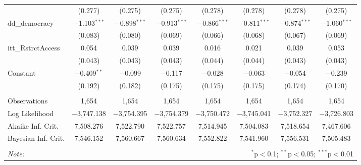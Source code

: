 \begin{sidewaystable}[!htbp]
\begin{tabular}{@{\extracolsep{5pt}}lccccccc}
  & (0.277) & (0.275) & (0.275) & (0.278) & (0.278) & (0.278) & (0.275) \\ 
  dd\_democracy & $-$1.103$^{***}$ & $-$0.898$^{***}$ & $-$0.913$^{***}$ & $-$0.866$^{***}$ & $-$0.811$^{***}$ & $-$0.874$^{***}$ & $-$1.060$^{***}$ \\ 
  & (0.083) & (0.080) & (0.069) & (0.066) & (0.068) & (0.067) & (0.069) \\ 
  itt\_RstrctAccess & 0.054 & 0.039 & 0.039 & 0.016 & 0.021 & 0.039 & 0.053 \\ 
  & (0.043) & (0.043) & (0.043) & (0.044) & (0.044) & (0.043) & (0.043) \\ 
  Constant & $-$0.409$^{**}$ & $-$0.099 & $-$0.117 & $-$0.028 & $-$0.063 & $-$0.054 & $-$0.239 \\ 
  & (0.192) & (0.182) & (0.175) & (0.175) & (0.175) & (0.174) & (0.170) \\ 
 \hline \\[-1.8ex] 
Observations & 1,654 & 1,654 & 1,654 & 1,654 & 1,654 & 1,654 & 1,654 \\ 
Log Likelihood & $-$3,747.138 & $-$3,754.395 & $-$3,754.379 & $-$3,750.472 & $-$3,745.041 & $-$3,752.327 & $-$3,726.803 \\ 
Akaike Inf. Crit. & 7,508.276 & 7,522.790 & 7,522.757 & 7,514.945 & 7,504.083 & 7,518.654 & 7,467.606 \\ 
Bayesian Inf. Crit. & 7,546.152 & 7,560.667 & 7,560.634 & 7,552.822 & 7,541.960 & 7,556.531 & 7,505.483 \\ 
\hline 
\hline \\[-1.8ex] 
\textit{Note:}  & \multicolumn{7}{r}{$^{*}$p$<$0.1; $^{**}$p$<$0.05; $^{***}$p$<$0.01} \\ 
\end{tabular} 
\end{sidewaystable} 

